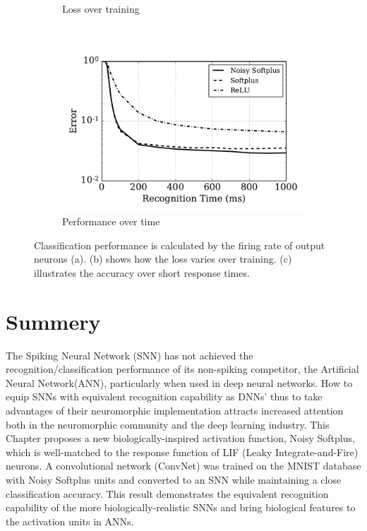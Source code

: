 \begin{figure}[bt!]
\begin{subfigure}[t]{0.7\textwidth}
		    \caption{Loss over training}
		    \label{Fig:loss}
		\end{subfigure}\\
		\begin{subfigure}[t]{0.7\textwidth}
			\includegraphics[width=\textwidth]{pics_iconip/9.pdf}
		    \caption{Performance over time}
		    \label{Fig:response}
		\end{subfigure}

		\caption{
			Classification performance is calculated by the firing rate of output neurons (a).
			(b) shows how the loss varies over training.
			(c) illustrates the accuracy over short response times.}
		\label{fig:training}	
	\end{figure}
\section{Summery}
	The Spiking Neural Network (SNN) has not achieved the recognition/classification performance of its non-spiking competitor, the Artificial Neural Network(ANN), particularly when used in deep neural networks.
	How to equip SNNs with equivalent recognition capability as DNNs' thus to take advantages of their neuromorphic implementation attracts increased attention both in the neuromorphic community and the deep learning industry.
	This Chapter proposes a new biologically-inspired activation function, Noisy Softplus, which is well-matched to the response function of LIF (Leaky Integrate-and-Fire) neurons.
	A convolutional network (ConvNet) was trained on the MNIST database with Noisy Softplus units and converted to an SNN while maintaining a close classification accuracy.
	This result demonstrates the equivalent recognition capability of the more biologically-realistic SNNs and bring biological features to the activation units in ANNs.
	
